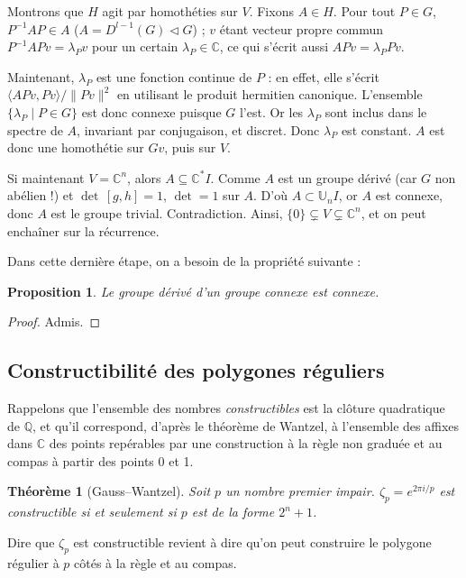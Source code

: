 \documentclass[a4paper, 11pt]{article}
\def\Q{\mathbb{Q}}
\def\C{\mathbb{C}}
\newtheorem*{proposition}{Proposition}
\newtheorem*{theorem}{Théorème}
\begin{document}
Montrons que $H$ agit par homothéties sur $V$. Fixons $A \in H$. Pour tout $P
\in G$, $P^{-1}AP \in A$ ($A = D^{l-1}(G) \triangleleft G$) ; $v$ étant vecteur
propre commun $P^{-1}APv = \lambda_P v$ pour un certain $\lambda_P \in \C$, ce
qui s'écrit aussi $APv = \lambda_P Pv$.

Maintenant, $\lambda_P$ est une fonction continue de $P$ : en effet, elle
s'écrit $\langle APv, Pv \rangle / \|Pv\|^2$ en utilisant le produit hermitien
canonique. L'ensemble $\{ \lambda_P \mid P \in G \}$ est donc connexe puisque
$G$ l'est. Or les $\lambda_P$ sont inclus dans le spectre de $A$, invariant par
conjugaison, et discret. Donc $\lambda_P$ est constant. $A$ est donc une
homothétie sur $Gv$, puis sur $V$.

Si maintenant $V = \C^n$, alors $A \subseteq \C^*I$. Comme $A$ est un groupe
dérivé (car $G$ non abélien !) et $\det\,[g,h] = 1$, $\det = 1$ sur $A$. D'où $A
\subset \mathbb{U}_nI$, or $A$ est connexe, donc $A$ est le groupe trivial.
Contradiction. Ainsi, $\{0\} \subsetneq V \subsetneq \C^n$, et on peut enchaîner
sur la récurrence.

Dans cette dernière étape, on a besoin de la propriété suivante :
\begin{proposition}
  Le groupe dérivé d'un groupe connexe est connexe.
\end{proposition}
\begin{proof}
  Admis.
\end{proof}

\newpage


\subsection{Constructibilité des polygones réguliers}

Rappelons que l'ensemble des nombres \emph{constructibles} est la clôture
quadratique de $\Q$, et qu'il correspond, d'après le théorème de Wantzel, à
l'ensemble des affixes dans $\C$ des points repérables par une construction à la
règle non graduée et au compas à partir des points 0 et 1.

\begin{theorem}[Gauss--Wantzel]
  Soit $p$ un nombre premier impair. $\zeta_p = e^{2\pi i / p}$ est
  constructible si et seulement si $p$ est de la forme $2^n + 1$.
\end{theorem}

Dire que $\zeta_p$ est constructible revient à dire qu'on peut construire le
polygone régulier à $p$ côtés à la règle et au compas.
\end{document}
